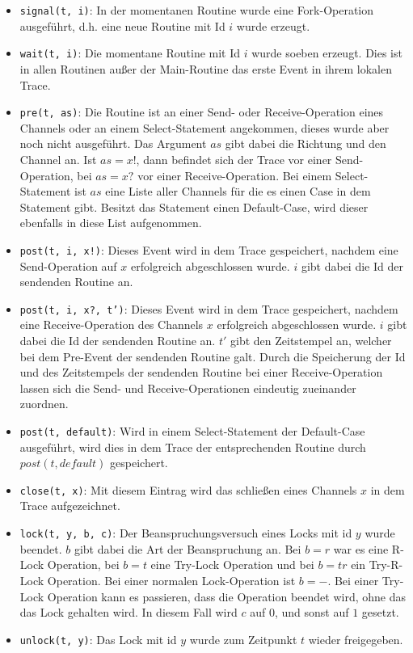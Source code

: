 \begin{itemize}
  \item \texttt{signal(t, i)}: In der momentanen Routine wurde
    eine Fork-Operation ausgeführt,
    d.h. eine neue Routine mit Id $i$ wurde erzeugt.
  \item \texttt{wait(t, i)}: Die momentane Routine mit Id $i$ wurde soeben erzeugt. Dies ist 
    in allen Routinen außer der Main-Routine das erste Event in ihrem lokalen Trace.
  \item \texttt{pre(t, as)}: Die Routine ist an einer Send- oder Receive-Operation eines 
    Channels oder an einem Select-Statement angekommen, dieses wurde aber noch nicht 
    ausgeführt. Das Argument $as$ gibt dabei die Richtung und den Channel an. 
    Ist $as = x!$, dann befindet sich der Trace vor einer Send-Operation, bei 
    $as = x?$ vor einer Receive-Operation. Bei einem Select-Statement ist 
    $as$ eine Liste aller Channels für die es einen 
    Case in dem Statement gibt. Besitzt das Statement einen Default-Case, wird
    dieser ebenfalls in diese List aufgenommen.
  \item \texttt{post(t, i, x!)}: Dieses Event wird in dem Trace gespeichert, nachdem 
    eine Send-Operation auf $x$ erfolgreich abgeschlossen wurde. 
    $i$ gibt dabei die Id der sendenden Routine
    an.
  \item \texttt{post(t, i, x?, t')}: Dieses Event wird in dem Trace gespeichert, nachdem 
    eine Receive-Operation des Channels $x$ erfolgreich abgeschlossen wurde. 
    $i$ gibt dabei die Id der sendenden Routine an. $t'$ gibt den Zeitstempel an,
    welcher bei dem Pre-Event der sendenden Routine galt. Durch die Speicherung der Id und des 
    Zeitstempels der sendenden Routine bei einer Receive-Operation lassen sich 
    die Send- und Receive-Operationen eindeutig zueinander zuordnen.
  \item \texttt{post(t, default)}: Wird in einem Select-Statement der Default-Case ausgeführt,
    wird dies in dem Trace der entsprechenden Routine durch $post(t, default)$ 
    gespeichert.
  \item \texttt{close(t, x)}: Mit diesem Eintrag wird das schließen eines Channels $x$ 
    in dem Trace aufgezeichnet.
  \item \texttt{lock(t, y, b, c)}: Der Beanspruchungsversuch eines Locks mit id $y$ wurde beendet. 
    $b$ gibt dabei die Art der Beanspruchung an. Bei $b = r$ war es eine R-Lock
    Operation, bei $b = t$ eine Try-Lock Operation und bei $b = tr$ ein Try-R-Lock
    Operation. Bei einer normalen Lock-Operation ist $b = -$. Bei einer 
    Try-Lock Operation kann es passieren, dass die Operation beendet wird, 
    ohne das das Lock gehalten wird. In diesem Fall wird $c$ auf $0$, und 
    sonst auf $1$ gesetzt. 
  \item \texttt{unlock(t, y)}: Das Lock mit id $y$ wurde zum Zeitpunkt 
    $t$ wieder freigegeben. 
\end{itemize}
